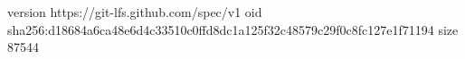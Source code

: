 version https://git-lfs.github.com/spec/v1
oid sha256:d18684a6ca48e6d4c33510c0ffd8dc1a125f32c48579c29f0c8fc127e1f71194
size 87544
